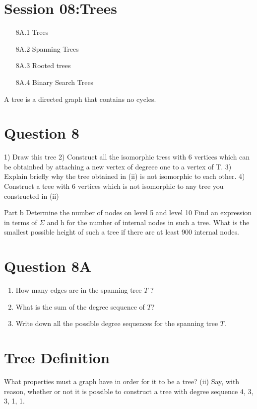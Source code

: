 \documentclass[]{report}
\begin{document}
\section*{Session 08:Trees}
\begin{itemize}
\item[8A.1] Trees
\item[8A.2] Spanning Trees
\item[8A.3] Rooted trees
\item[8A.4] Binary Search Trees
\end{itemize}
A tree is a directed graph that contains no cycles.
\section{Question 8}

1) Draw this tree
2) Construct all the isomorphic tress with 6 vertices which can be obtainbed by attaching a new vertex of degreee one to a vertex of T.
3) Explain briefly why the tree obtained in (ii) is not isomorphic to each other.
4) Construct a tree with 6 vertices which is not isomorphic to any tree you constructed in (ii)

Part b
Determine the number of nodes on level 5 and level 10
Find an expression in terms of $\Sigma$ and h for the number of internal nodes in such a tree.
What is the smallest possible height of such a tree if there are at least 900 internal nodes.


\section{Question 8A}
\begin{enumerate}
\item How many edges are in the spanning tree $T$ ?
\item What is the sum of the degree sequence of $T$?
\item Write down all the possible degree sequences for the spanning tree $T$.
\end{enumerate}

\section{Tree Definition}
What properties must a graph have in order for it to be a
tree?
(ii) Say, with reason, whether or not it is possible to construct a tree with
degree sequence 4, 3, 3, 1, 1.
\newpage
\end{document}

